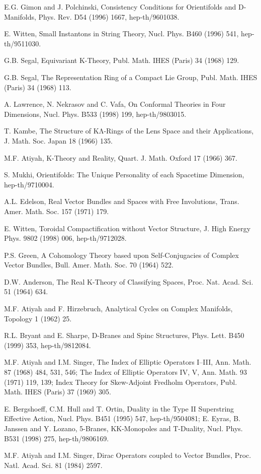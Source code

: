 \documentclass[11pt,a4paper]{ctexart}
\begin{document}
\begin{enumerate}[label={[\arabic*]},leftmargin=*,itemsep=2pt]
\item E.G. Gimon and J. Polchinski, Consistency Conditions for Orientifolds and D- Manifolds, Phys. Rev. D54 (1996) 1667, hep-th/9601038.
\item E. Witten, Small Instantons in String Theory, Nucl. Phys. B460 (1996) 541, hep-th/9511030.
\item G.B. Segal, Equivariant K-Theory, Publ. Math. IHES (Paris) 34 (1968) 129.
\item G.B. Segal, The Representation Ring of a Compact Lie Group, Publ. Math. IHES (Paris) 34 (1968) 113.
\item A. Lawrence, N. Nekrasov and C. Vafa, On Conformal Theories in Four Dimensions, Nucl. Phys. B533 (1998) 199, hep-th/9803015.
\item T. Kambe, The Structure of KΛ-Rings of the Lens Space and their Applications, J. Math. Soc. Japan 18 (1966) 135.
\item M.F. Atiyah, K-Theory and Reality, Quart. J. Math. Oxford 17 (1966) 367.
\item S. Mukhi, Orientifolds: The Unique Personality of each Spacetime Dimension, hep-th/9710004.
\item A.L. Edelson, Real Vector Bundles and Spaces with Free Involutions, Trans. Amer. Math. Soc. 157 (1971) 179.
\item E. Witten, Toroidal Compactification without Vector Structure, J. High Energy Phys. 9802 (1998) 006, hep-th/9712028.
\item P.S. Green, A Cohomology Theory based upon Self-Conjugacies of Complex Vector Bundles, Bull. Amer. Math. Soc. 70 (1964) 522.
\item D.W. Anderson, The Real K-Theory of Classifying Spaces, Proc. Nat. Acad. Sci. 51 (1964) 634.
\item M.F. Atiyah and F. Hirzebruch, Analytical Cycles on Complex Manifolds, Topology 1 (1962) 25.
\item R.L. Bryant and E. Sharpe, D-Branes and Spinc Structures, Phys. Lett. B450 (1999) 353, hep-th/9812084.
\item M.F. Atiyah and I.M. Singer, The Index of Elliptic Operators I–III, Ann. Math. 87 (1968) 484, 531, 546; The Index of Elliptic Operators IV, V, Ann. Math. 93 (1971) 119, 139; Index Theory for Skew-Adjoint Fredholm Operators, Publ. Math. IHES (Paris) 37 (1969) 305.
\item E. Bergshoeff, C.M. Hull and T. Ortin, Duality in the Type II Superstring Effective Action, Nucl. Phys. B451 (1995) 547, hep-th/9504081; E. Eyras, B. Janssen and Y. Lozano, 5-Branes, KK-Monopoles and T-Duality, Nucl. Phys. B531 (1998) 275, hep-th/9806169.
\item M.F. Atiyah and I.M. Singer, Dirac Operators coupled to Vector Bundles, Proc. Natl. Acad. Sci. 81 (1984) 2597.
\end{enumerate}
\end{document}
